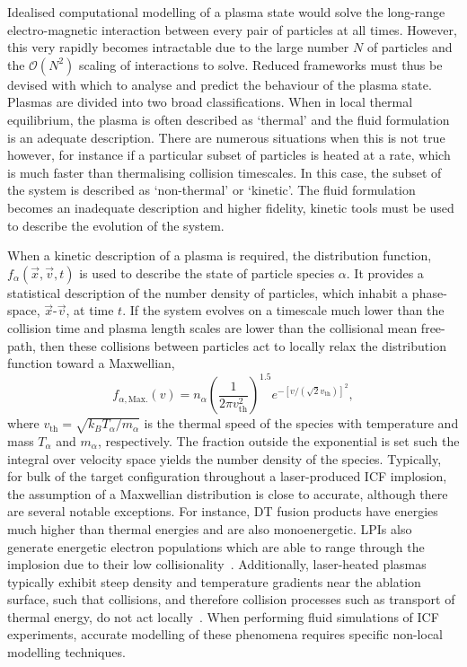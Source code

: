 Idealised computational modelling of a plasma state would solve the long-range electro-magnetic interaction between every pair of particles at all times.
However, this very rapidly becomes intractable due to the large number $N$ of particles and the $\mathcal{O}(N^2)$ scaling of interactions to solve.
Reduced frameworks must thus be devised with which to analyse and predict the behaviour of the plasma state.
Plasmas are divided into two broad classifications.
When in local thermal equilibrium, the plasma is often described as `thermal' and the fluid formulation is an adequate description.
There are numerous situations when this is not true however, for instance if a particular subset of particles is heated at a rate, which is much faster than thermalising collision timescales.
In this case, the subset of the system is described as `non-thermal' or `kinetic'.
The fluid formulation becomes an inadequate description and higher fidelity, kinetic tools must be used to describe the evolution of the system.

When a kinetic description of a plasma is required, the distribution function, $f_{\alpha}(\vec{x},\vec{v},t)$ is used to describe the state of particle species $\alpha$.
It provides a statistical description of the number density of particles, which inhabit a phase-space, $\vec{x}$-$\vec{v}$, at time $t$.
If the system evolves on a timescale much lower than the collision time and plasma length scales are lower than the collisional mean free-path, then these collisions between particles act to locally relax the distribution function toward a Maxwellian,
\begin{equation}
    \label{eq:theory_maxwellian}
    f_{\alpha,\text{Max.}}(v) = n_{\alpha} {\left( \frac{1}{2\pi v_{\text{th}}^2} \right)}^{1.5} e^{-\left [ v/ \left (\sqrt{2} v_{\text{th}} \right ) \right ]^2},
\end{equation}
where $v_{\text{th}}=\sqrt{k_B T_{\alpha}/m_{\alpha}}$ is the thermal speed of the species with temperature and mass $T_{\alpha}$ and $m_{\alpha}$, respectively.
The fraction outside the exponential is set such the integral over velocity space yields the number density of the species.
Typically, for bulk of the target configuration throughout a laser-produced \ac{ICF} implosion, the assumption of a Maxwellian distribution is close to accurate, although there are several notable exceptions.
For instance, DT fusion products have energies much higher than thermal energies and are also monoenergetic.
\ac{LPIs} also generate energetic electron populations which are able to range through the implosion due to their low collisionality~\cite{barlow_role_2022}.
Additionally, laser-heated plasmas typically exhibit steep density and temperature gradients near the ablation surface, such that collisions, and therefore collision processes such as transport of thermal energy, do not act locally~\cite{epperlein_practical_1991}.
When performing fluid simulations of \ac{ICF} experiments, accurate modelling of these phenomena requires specific non-local modelling techniques.

